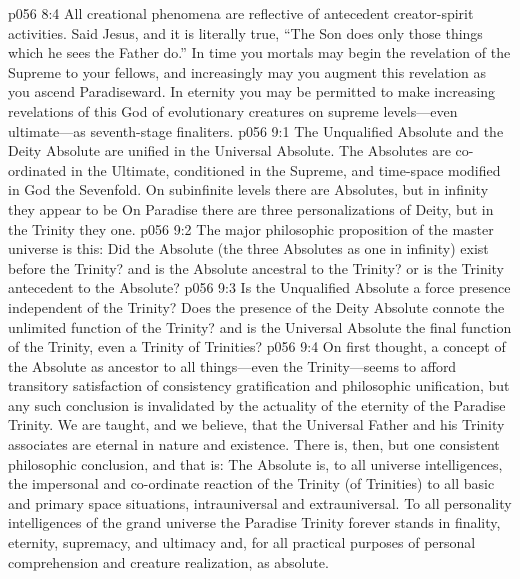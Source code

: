 \vs p056 8:4 All creational phenomena are reflective of antecedent creator\hyp{}spirit activities. Said Jesus, and it is literally true, “The Son does only those things which he sees the Father do.” In time you mortals may begin the revelation of the Supreme to your fellows, and increasingly may you augment this revelation as you ascend Paradiseward. In eternity you may be permitted to make increasing revelations of this God of evolutionary creatures on supreme levels---even ultimate---as seventh\hyp{}stage finaliters.
\vs p056 9:1 The Unqualified Absolute and the Deity Absolute are unified in the Universal Absolute. The Absolutes are co\hyp{}ordinated in the Ultimate, conditioned in the Supreme, and time\hyp{}space modified in God the Sevenfold. On subinfinite levels there are  Absolutes, but in infinity they appear to be  On Paradise there are three personalizations of Deity, but in the Trinity they  one.
\pc \vs p056 9:2 The major philosophic proposition of the master universe is this: Did the Absolute (the three Absolutes as one in infinity) exist before the Trinity? and is the Absolute ancestral to the Trinity? or is the Trinity antecedent to the Absolute?
\vs p056 9:3 Is the Unqualified Absolute a force presence independent of the Trinity? Does the presence of the Deity Absolute connote the unlimited function of the Trinity? and is the Universal Absolute the final function of the Trinity, even a Trinity of Trinities?
\vs p056 9:4 On first thought, a concept of the Absolute as ancestor to all things---even the Trinity---seems to afford transitory satisfaction of consistency gratification and philosophic unification, but any such conclusion is invalidated by the actuality of the eternity of the Paradise Trinity. We are taught, and we believe, that the Universal Father and his Trinity associates are eternal in nature and existence. There is, then, but one consistent philosophic conclusion, and that is: The Absolute is, to all universe intelligences, the impersonal and co\hyp{}ordinate reaction of the Trinity (of Trinities) to all basic and primary space situations, intrauniversal and extrauniversal. To all personality intelligences of the grand universe the Paradise Trinity forever stands in finality, eternity, supremacy, and ultimacy and, for all practical purposes of personal comprehension and creature realization, as absolute.
